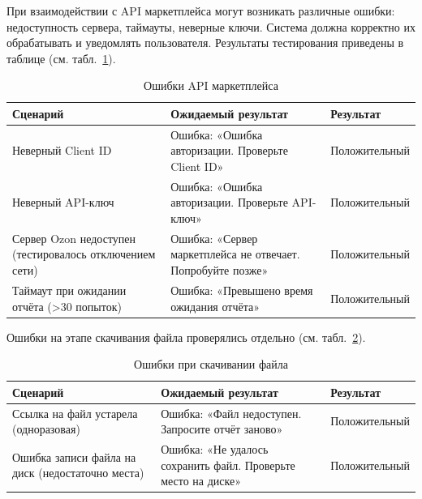 При взаимодействии с API маркетплейса могут возникать различные ошибки: недоступность сервера, таймауты, неверные ключи. Система должна корректно их обрабатывать и уведомлять пользователя. Результаты тестирования приведены в таблице (см. табл.~\ref{tab:stressApiErrors}).

\begin{table}[H]
\caption{\label{tab:stressApiErrors}Ошибки API маркетплейса}
\small
\begin{center}
\vspace{-0.5cm}\begin{tabular}{|p{5cm}|p{7cm}|p{3cm}|}
\hline
Сценарий & Ожидаемый результат & Результат \\ \hline
Неверный Client ID & Ошибка: «Ошибка авторизации. Проверьте Client ID» & Положительный \\ \hline
Неверный API-ключ & Ошибка: «Ошибка авторизации. Проверьте API-ключ» & Положительный \\ \hline
Сервер Ozon недоступен (тестировалось отключением сети) & Ошибка: «Сервер маркетплейса не отвечает. Попробуйте позже» & Положительный \\ \hline
Таймаут при ожидании отчёта (>30 попыток) & Ошибка: «Превышено время ожидания отчёта» & Положительный \\ \hline
\end{tabular}
\end{center}
\end{table}

Ошибки на этапе скачивания файла проверялись отдельно (см. табл.~\ref{tab:stressDownloadErrors}).

\begin{table}[H]
\caption{\label{tab:stressDownloadErrors}Ошибки при скачивании файла}
\small
\begin{center}
\vspace{-0.5cm}\begin{tabular}{|p{5cm}|p{7cm}|p{3cm}|}
\hline
Сценарий & Ожидаемый результат & Результат \\ \hline
Ссылка на файл устарела (одноразовая) & Ошибка: «Файл недоступен. Запросите отчёт заново» & Положительный \\ \hline
Ошибка записи файла на диск (недостаточно места) & Ошибка: «Не удалось сохранить файл. Проверьте место на диске» & Положительный \\ \hline
\end{tabular}
\end{center}
\end{table}

